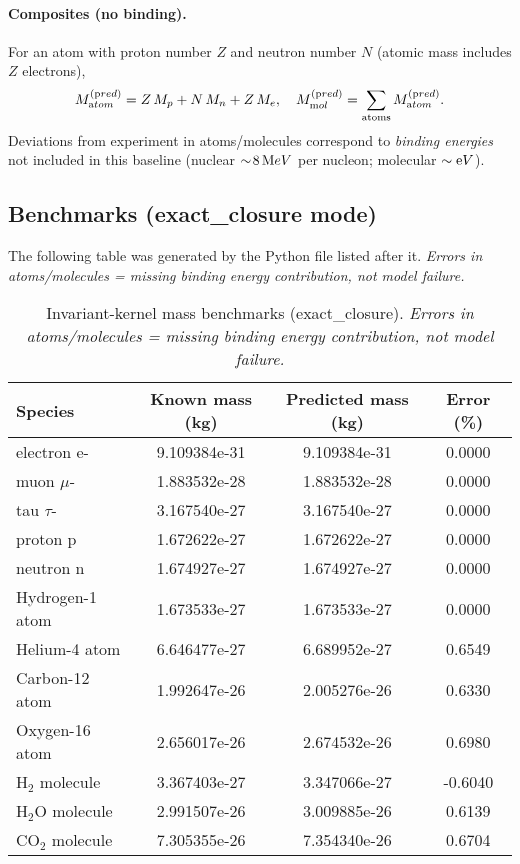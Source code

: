 \documentclass[11pt]{article}
\begin{document}
\paragraph{Composites (no binding).}
    For an atom with proton number $Z$ and neutron number $N$ (atomic mass includes $Z$ electrons),
    \[
        M_{\textrm atom}^{(\textrm pred)} = Z\,M_p+N\,M_n+Z\,M_e,\quad
        M_{\textrm mol}^{(\textrm pred)}=\sum_{\text{atoms}}M_{\textrm atom}^{(\textrm pred)}.
    \]
    Deviations from experiment in atoms/molecules correspond to \emph{binding energies} not included in this baseline (nuclear $\sim\!8\,{\textrm MeV}$ per nucleon; molecular $\sim{\textrm eV}$).

\subsection{Benchmarks (exact\_closure mode)}
\label{sec:benchmarks-exact-closure}
The following table was generated by the Python file listed after it.
\emph{Errors in atoms/molecules = missing binding energy contribution, not model failure.}

\begin{table}[H]
\centering
\caption{Invariant-kernel mass benchmarks (exact\_closure). \emph{Errors in atoms/molecules = missing binding energy contribution, not model failure.}}
\begin{tabular}{lccc}
\toprule
Species & Known mass (kg) & Predicted mass (kg) & Error (\%)\\
\midrule
electron e- & 9.109384e-31 & 9.109384e-31 & 0.0000\\
muon $\mu$- & 1.883532e-28 & 1.883532e-28 & 0.0000\\
tau $\tau$- & 3.167540e-27 & 3.167540e-27 & 0.0000\\
proton p & 1.672622e-27 & 1.672622e-27 & 0.0000\\
neutron n & 1.674927e-27 & 1.674927e-27 & 0.0000\\
Hydrogen-1 atom & 1.673533e-27 & 1.673533e-27 & 0.0000\\
Helium-4 atom & 6.646477e-27 & 6.689952e-27 & 0.6549\\
Carbon-12 atom & 1.992647e-26 & 2.005276e-26 & 0.6330\\
Oxygen-16 atom & 2.656017e-26 & 2.674532e-26 & 0.6980\\
H$_2$ molecule & 3.367403e-27 & 3.347066e-27 & -0.6040\\
H$_2$O molecule & 2.991507e-26 & 3.009885e-26 & 0.6139\\
CO$_2$ molecule & 7.305355e-26 & 7.354340e-26 & 0.6704\\
\bottomrule
\end{tabular}\label{tab:benchmarks-exact-closure}
\end{table}
\end{document}
